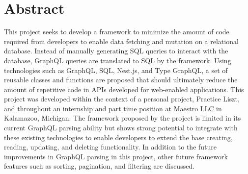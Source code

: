 \section*{Abstract}
This project seeks to develop a framework to minimize the amount of code required from developers to enable data fetching and mutation on a relational database.  Instead of manually generating SQL queries to interact with the database, GraphQL queries are translated to SQL by the framework.  Using technologies such as GraphQL, SQL, Nest.js, and Type GraphQL, a set of reusable classes and functions are proposed that should ultimately reduce the amount of repetitive code in APIs developed for web-enabled applications. This project was developed within the context of a personal project, Practice Liszt, and throughout an internship and part time position at Maestro LLC in Kalamazoo, Michigan.  The framework proposed by the project is limited in its current GraphQL parsing ability but shows strong potential to integrate with these existing technologies to enable developers to extend the base creating, reading, updating, and deleting functionality.  In addition to the future improvements in GraphQL parsing in this project, other future framework features such as sorting, pagination, and filtering are discussed.